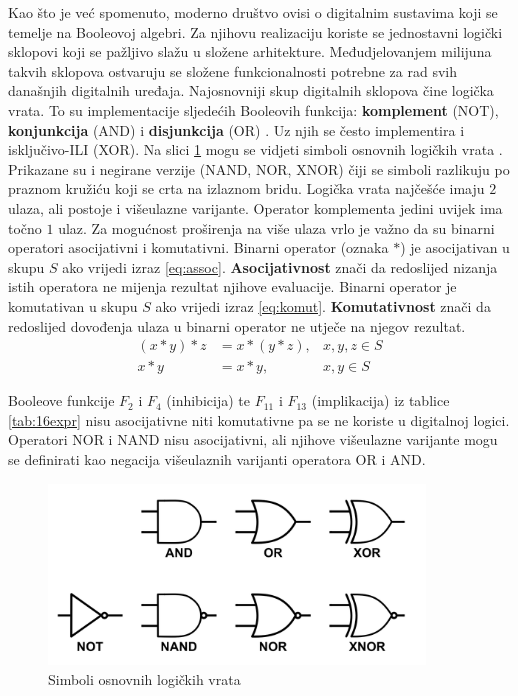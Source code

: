 \documentclass[times, utf8, diplomski]{fer}
\begin{document}
Kao što je već spomenuto, moderno društvo ovisi o digitalnim sustavima koji se temelje na Booleovoj algebri. Za njihovu realizaciju koriste se jednostavni logički sklopovi koji se pažljivo slažu u složene arhitekture. Međudjelovanjem milijuna takvih sklopova ostvaruju se složene funkcionalnosti potrebne za rad svih današnjih digitalnih uređaja. Najosnovniji skup digitalnih sklopova čine logička vrata. To su implementacije sljedećih Booleovih funkcija: \textbf{komplement} (NOT), \textbf{konjunkcija} (AND) i \textbf{disjunkcija} (OR) \cite{book:digital_design}. Uz njih se često implementira i isključivo-ILI (XOR). Na slici \ref{fig:logic-gates} mogu se vidjeti simboli osnovnih logičkih vrata \cite{site:schemeIt}. Prikazane su i negirane verzije (NAND, NOR, XNOR) čiji se simboli razlikuju po praznom kružiću koji se crta na izlaznom bridu. Logička vrata najčešće imaju $2$ ulaza, ali postoje i višeulazne varijante. Operator komplementa jedini uvijek ima točno $1$ ulaz. Za mogućnost proširenja na više ulaza vrlo je važno da su binarni operatori asocijativni i komutativni. Binarni operator (oznaka $*$) je asocijativan u skupu $S$ ako vrijedi izraz \ref{eq:assoc}. \textbf{Asocijativnost} znači da redoslijed nizanja istih operatora ne mijenja rezultat njihove evaluacije. Binarni operator je komutativan u skupu $S$ ako vrijedi izraz \ref{eq:komut}. \textbf{Komutativnost} znači da redoslijed dovođenja ulaza u binarni operator ne utječe na njegov rezultat.
%
\begin{align}
	\label{eq:assoc}
	(x*y)*z &= x*(y*z), & x,y,z \in S \\
	\label{eq:komut}
	x*y &= x*y, & x,y \in S
\end{align}

\noindent
Booleove funkcije $F_{2}$ i $F_{4}$ (inhibicija) te $F_{11}$ i $F_{13}$ (implikacija) iz tablice \ref{tab:16expr} nisu asocijativne niti komutativne pa se ne koriste u digitalnoj logici. Operatori NOR i NAND nisu asocijativni, ali njihove višeulazne varijante mogu se definirati kao negacija višeulaznih varijanti operatora OR i AND.

\begin{figure}[htb]
	\centering
	\includegraphics[width=10cm]{img/logic_gates.png}
	\caption{Simboli osnovnih logičkih vrata}
	\label{fig:logic-gates}
\end{figure}
\end{document}
